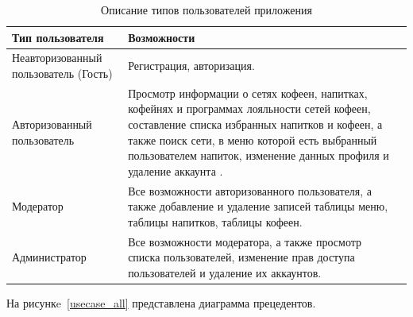 \begin{table}[ht]
	\begin{center}
		\begin{threeparttable}
			\caption{\label{users_descr} Описание типов пользователей приложения}
			\begin{tabular}{|p{6cm}|p{10cm}|c|}
				\hline
				
				
				\textbf{Тип пользователя} & \textbf{Возможности}  \\ \hline
				Неавторизованный пользователь (Гость) & Регистрация,  авторизация.\\ \hline
				Авторизованный пользователь & Просмотр информации о сетях кофеен, напитках, кофейнях и программах лояльности сетей кофеен, составление списка избранных напитков и кофеен, а также поиск сети, в меню которой есть выбранный пользователем напиток, изменение данных профиля и удаление аккаунта . \\ \hline
				Модератор & Все возможности авторизованного пользователя, а также добавление и удаление записей таблицы меню, таблицы напитков, таблицы кофеен.\\ \hline
				Администратор & Все возможности модератора, а также просмотр списка пользователей, изменение прав доступа пользователей и удаление их аккаунтов.\\ \hline
				
			\end{tabular}
		\end{threeparttable}
	\end{center}
\end{table}



На рисункe~\ref{usecase_all} представлена диаграмма прецедентов.

